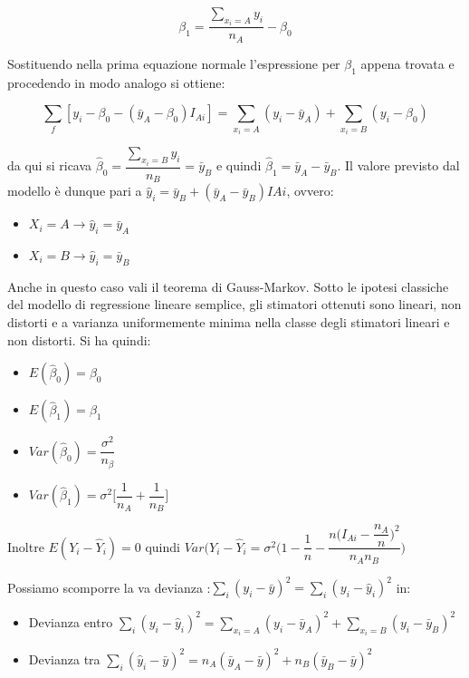 \documentclass[a4paper]{extarticle}
\begin{document}
\begin{equation*}
\beta_1 = \dfrac{\sum\limits_{x_i = A}y_i}{n_A} - \beta_0
\end{equation*}

Sostituendo nella prima equazione normale l'espressione per $\beta_1$ appena trovata e procedendo in modo analogo si ottiene:

\begin{equation*}
\sum_f [ y_i - \beta_0 - (\bar y_A - \beta_0)I_{Ai}] = \sum\limits_{x_i=A}(y_i - \bar y_A)+ \sum\limits_{x_i=B}(y_i - \beta_0)
\end{equation*}

da qui si ricava $\hat \beta_0 = \dfrac{\sum\limits_{x_i=B}y_i}{n_B} = \bar y_B$  e quindi $\hat \beta_1 = \bar y_A - \bar y_B$. Il valore previsto dal modello è dunque pari a $\hat y_i = \bar y_B + (\bar y_A - \bar y_B)I{Ai}$, ovvero:

\begin{itemize}
\item $X_i = A \rightarrow \hat y_i = \bar y_A$
\item $X_i = B \rightarrow \hat y_i = \bar y_B$
\end{itemize}

Anche in questo caso vali il teorema di Gauss-Markov. Sotto le ipotesi classiche del modello di regressione lineare semplice, gli stimatori ottenuti sono lineari, non distorti e a varianza uniformemente minima nella classe degli stimatori lineari e non distorti. Si ha quindi:

\begin{itemize}
\item $E(\hat \beta_0) = \beta_0$
\item $E(\hat \beta_1) = \beta_1$
\item $Var(\hat \beta_0)= \dfrac{\sigma^2}{n_{\beta}}$
\item $Var(\hat \beta_1) = \sigma^2 \biggr [ \dfrac{1}{n_A} + \dfrac{1}{n_{B}}\biggl]$
\end{itemize}

Inoltre $E(Y_i - \hat Y_i) = 0$ quindi $Var(Y_i - \hat Y_i =  \sigma^2 \Biggr( 1- \dfrac{1}{n} - \dfrac{n \biggr( I_{Ai}-\dfrac{n_A}{n} \biggl)^2}{n_A n_B} \Biggl )$

Possiamo scomporre la va devianza :$\sum\limits_i(y_i - \bar y)^2 = \sum\limits_i(y_i - \hat y_i)^2$ in:
\begin{itemize}
\item Devianza entro $ \sum\limits_{i} (y_i - \hat y_i)^2 = \sum\limits_{x_i = A} (y_i - \bar y_A)^2 + \sum\limits_{x_i=B} ( y_i - \bar y_B)^2 $
\item Devianza tra $\sum\limits_i(\hat y_i - \bar y)^2 = n_A ( \bar y_A - \bar y)^2 + n_B(\bar y_B - \bar y)^2$
\end{itemize} 
\end{document}
